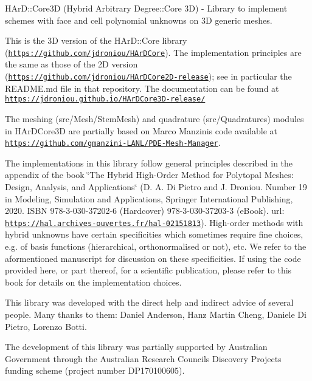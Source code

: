 H\+Ar\+D\+::\+Core3D (Hybrid Arbitrary Degree\+::\+Core 3D) -\/ Library to implement schemes with face and cell polynomial unknowns on 3D generic meshes.

This is the 3D version of the H\+Ar\+D\+::\+Core library (\href{https://github.com/jdroniou/HArDCore}{\tt https\+://github.\+com/jdroniou/\+H\+Ar\+D\+Core}). The implementation principles are the same as those of the 2D version (\href{https://github.com/jdroniou/HArDCore2D-release}{\tt https\+://github.\+com/jdroniou/\+H\+Ar\+D\+Core2\+D-\/release}); see in particular the R\+E\+A\+D\+M\+E.\+md file in that repository. The documentation can be found at \href{https://jdroniou.github.io/HArDCore3D-release/}{\tt https\+://jdroniou.\+github.\+io/\+H\+Ar\+D\+Core3\+D-\/release/}

The meshing (src/\+Mesh/\+Stem\+Mesh) and quadrature (src/\+Quadratures) modules in H\+Ar\+D\+Core3D are partially based on Marco Manzini\textquotesingle{}s code available at \href{https://github.com/gmanzini-LANL/PDE-Mesh-Manager}{\tt https\+://github.\+com/gmanzini-\/\+L\+A\+N\+L/\+P\+D\+E-\/\+Mesh-\/\+Manager}.

The implementations in this library follow general principles described in the appendix of the book \char`\"{}\+The Hybrid High-\/\+Order Method for Polytopal Meshes\+: Design, Analysis, and Applications\char`\"{} (D. A. Di Pietro and J. Droniou. Number 19 in Modeling, Simulation and Applications, Springer International Publishing, 2020. I\+S\+BN 978-\/3-\/030-\/37202-\/6 (Hardcover) 978-\/3-\/030-\/37203-\/3 (e\+Book). url\+: \href{https://hal.archives-ouvertes.fr/hal-02151813}{\tt https\+://hal.\+archives-\/ouvertes.\+fr/hal-\/02151813}). High-\/order methods with hybrid unknowns have certain specificities which sometimes require fine choices, e.\+g. of basis functions (hierarchical, orthonormalised or not), etc. We refer to the aformentioned manuscript for discussion on these specificities. If using the code provided here, or part thereof, for a scientific publication, please refer to this book for details on the implementation choices.

This library was developed with the direct help and indirect advice of several people. Many thanks to them\+: Daniel Anderson, Hanz Martin Cheng, Daniele Di Pietro, Lorenzo Botti.

The development of this library was partially supported by Australian Government through the Australian Research Council\textquotesingle{}s Discovery Projects funding scheme (project number D\+P170100605). 